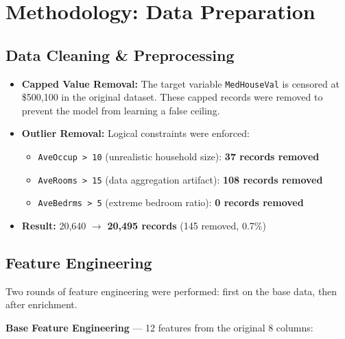 \documentclass[12pt,a4paper]{article}
\begin{document}
\newpage

\section{Methodology: Data Preparation}

\subsection{Data Cleaning \& Preprocessing}

\begin{itemize}
    \item \textbf{Capped Value Removal:} The target variable \texttt{MedHouseVal} is censored at \$500,100 in the original dataset. These capped records were removed to prevent the model from learning a false ceiling.
    \item \textbf{Outlier Removal:} Logical constraints were enforced:
    \begin{itemize}
        \item \texttt{AveOccup > 10} (unrealistic household size): \textbf{37 records removed}
        \item \texttt{AveRooms > 15} (data aggregation artifact): \textbf{108 records removed}
        \item \texttt{AveBedrms > 5} (extreme bedroom ratio): \textbf{0 records removed}
    \end{itemize}
    \item \textbf{Result:} 20,640 $\rightarrow$ \textbf{20,495 records} (145 removed, 0.7\%)
\end{itemize}

\subsection{Feature Engineering}

Two rounds of feature engineering were performed: first on the base data, then after enrichment.

\textbf{Base Feature Engineering} --- 12 features from the original 8 columns:
\end{document}
